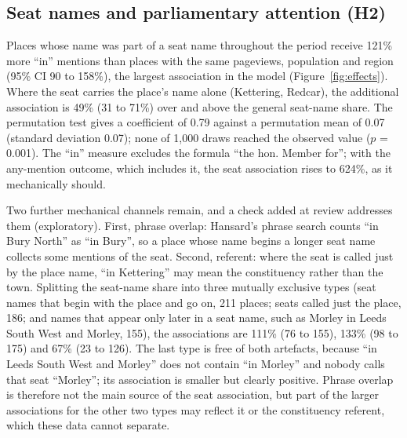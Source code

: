 \documentclass[11pt,a4paper]{article}
\begin{document}
\subsection{Seat names and parliamentary attention (H2)}
Places whose name was part of a seat name throughout the period receive 121\% more ``in'' mentions than places with the same pageviews, population and region (95\% CI 90 to 158\%), the largest association in the model (Figure~\ref{fig:effects}). Where the seat carries the place's name alone (Kettering, Redcar), the additional association is 49\% (31 to 71\%) over and above the general seat-name share. The permutation test gives a coefficient of 0.79 against a permutation mean of 0.07 (standard deviation 0.07); none of 1,000 draws reached the observed value ($p$ = 0.001). The ``in'' measure excludes the formula ``the hon. Member for''; with the any-mention outcome, which includes it, the seat association rises to 624\%, as it mechanically should.

Two further mechanical channels remain, and a check added at review addresses them (exploratory). First, phrase overlap: Hansard's phrase search counts ``in Bury North'' as ``in Bury'', so a place whose name begins a longer seat name collects some mentions of the seat. Second, referent: where the seat is called just by the place name, ``in Kettering'' may mean the constituency rather than the town. Splitting the seat-name share into three mutually exclusive types (seat names that begin with the place and go on, 211 places; seats called just the place, 186; and names that appear only later in a seat name, such as Morley in Leeds South West and Morley, 155), the associations are 111\% (76 to 155), 133\% (98 to 175) and 67\% (23 to 126). The last type is free of both artefacts, because ``in Leeds South West and Morley'' does not contain ``in Morley'' and nobody calls that seat ``Morley''; its association is smaller but clearly positive. Phrase overlap is therefore not the main source of the seat association, but part of the larger associations for the other two types may reflect it or the constituency referent, which these data cannot separate.
\end{document}

